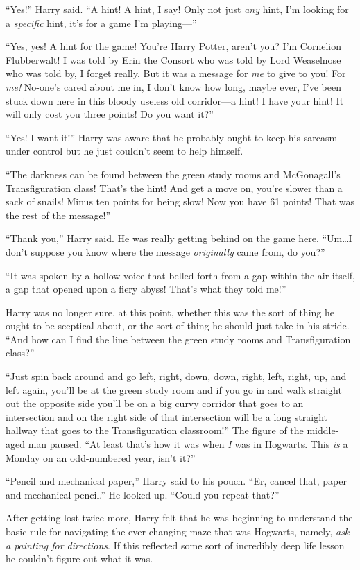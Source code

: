 “Yes!” Harry said. “A hint! A hint, I say! Only not just \emph{any} hint, I’m looking for a \emph{specific} hint, it’s for a game I’m playing—”

“Yes, yes! A hint for the game! You’re Harry Potter, aren’t you? I’m Cornelion Flubberwalt! I was told by Erin the Consort who was told by Lord Weaselnose who was told by, I forget really. But it was a message for \emph{me} to give to you! For \emph{me!} No-one’s cared about me in, I don’t know how long, maybe ever, I’ve been stuck down here in this bloody useless old corridor—a hint! I have your hint! It will only cost you three points! Do you want it?”

“Yes! I want it!” Harry was aware that he probably ought to keep his sarcasm under control but he just couldn’t seem to help himself.

“The darkness can be found between the green study rooms and McGonagall’s Transfiguration class! That’s the hint! And get a move on, you’re slower than a sack of snails! Minus ten points for being slow! Now you have 61 points! That was the rest of the message!”

“Thank you,” Harry said. He was really getting behind on the game here. “Um…I don’t suppose you know where the message \emph{originally} came from, do you?”

“It was spoken by a hollow voice that belled forth from a gap within the air itself, a gap that opened upon a fiery abyss! That’s what they told me!”

Harry was no longer sure, at this point, whether this was the sort of thing he ought to be sceptical about, or the sort of thing he should just take in his stride. “And how can I find the line between the green study rooms and Transfiguration class?”

“Just spin back around and go left, right, down, down, right, left, right, up, and left again, you’ll be at the green study room and if you go in and walk straight out the opposite side you’ll be on a big curvy corridor that goes to an intersection and on the right side of that intersection will be a long straight hallway that goes to the Transfiguration classroom!” The figure of the middle-aged man paused. “At least that’s how it was when \emph{I} was in Hogwarts. This \emph{is} a Monday on an odd-numbered year, isn’t it?”

“Pencil and mechanical paper,” Harry said to his pouch. “Er, cancel that, paper and mechanical pencil.” He looked up. “Could you repeat that?”

After getting lost twice more, Harry felt that he was beginning to understand the basic rule for navigating the ever-changing maze that was Hogwarts, namely, \emph{ask a painting for directions}. If this reflected some sort of incredibly deep life lesson he couldn’t figure out what it was.

